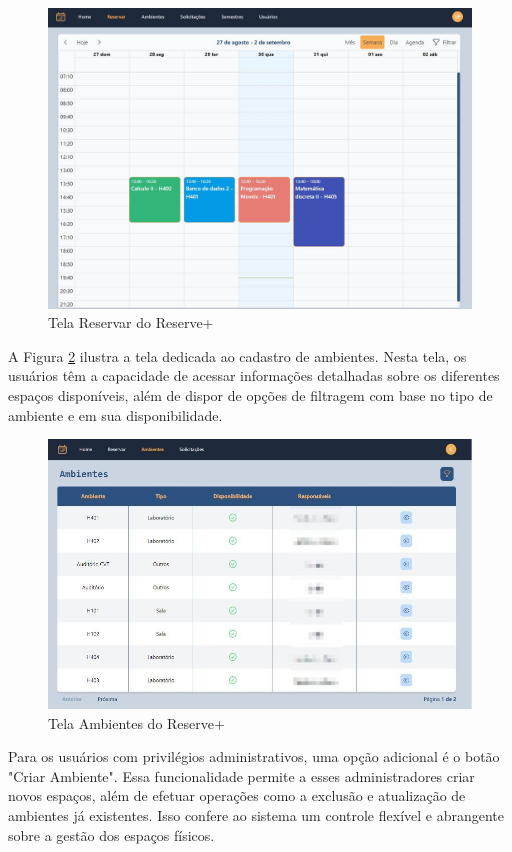 \documentclass[12pt]{article}
\begin{document}
\begin{figure}[ht]
\centering
\includegraphics[width=1.0\textwidth]{tela_reservar.jpg}
\caption{Tela Reservar do Reserve+}
\label{fig:tela_reservar}
\end{figure}

A Figura \ref{fig:tela_ambientes} ilustra a tela dedicada ao cadastro de ambientes. Nesta tela, os usuários têm a capacidade de acessar informações detalhadas sobre os diferentes espaços disponíveis, além de dispor de opções de filtragem com base no tipo de ambiente e em sua disponibilidade.

\begin{figure}[ht]
\centering
\includegraphics[width=1.0\textwidth]{tela_ambientes.jpg}
\caption{Tela Ambientes do Reserve+}
\label{fig:tela_ambientes}
\end{figure}

Para os usuários com privilégios administrativos, uma opção adicional é o botão "Criar Ambiente". Essa funcionalidade permite a esses administradores criar novos espaços, além de efetuar operações como a exclusão e atualização de ambientes já existentes. Isso confere ao sistema um controle flexível e abrangente sobre a gestão dos espaços físicos.
\end{document}
